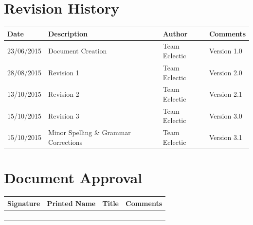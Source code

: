\documentclass[11pt]{article}
\begin{document}


\setcounter{tocdepth}{3}
\setcounter{secnumdepth}{5}
\tableofcontents

\newpage
\section{Revision History}
\begin{table}[h]
\begin{tabular}{llll}
\textbf{Date}          & \textbf{Description}  & \textbf{Author}       & \textbf{Comments}   \\ \hline
\multicolumn{1}{|R{2cm}|}{23/06/2015} & \multicolumn{1}{L{4.5cm}|}{Document Creation} & \multicolumn{1}{l|}{Team Eclectic} & \multicolumn{1}{L{4cm}|}{Version 1.0} \\ \hline
\multicolumn{1}{|R{2cm}|}{28/08/2015} & \multicolumn{1}{L{4.5cm}|}{Revision 1} & \multicolumn{1}{l|}{Team Eclectic} & \multicolumn{1}{L{4cm}|}{Version 2.0} \\ \hline
\multicolumn{1}{|R{2cm}|}{13/10/2015} & \multicolumn{1}{L{4.5cm}|}{Revision 2} & \multicolumn{1}{l|}{Team Eclectic} & \multicolumn{1}{L{4cm}|}{Version 2.1} \\ \hline
\multicolumn{1}{|R{2cm}|}{15/10/2015} & \multicolumn{1}{L{4.5cm}|}{Revision 3} & \multicolumn{1}{l|}{Team Eclectic} & \multicolumn{1}{L{4cm}|}{Version 3.0} \\ \hline
\multicolumn{1}{|R{2cm}|}{15/10/2015} & \multicolumn{1}{L{4.5cm}|}{Minor Spelling \& Grammar Corrections} & \multicolumn{1}{l|}{Team Eclectic} & \multicolumn{1}{L{4cm}|}{Version 3.1} \\ \hline
\end{tabular}
\end{table}

\section{Document Approval}
\begin{table}[h]
\begin{tabular}{llll}
\textbf{Signature}     & \textbf{Printed Name} & \textbf{Title}        & \textbf{Comments}     \\ \hline
\multicolumn{1}{|l|}{} & \multicolumn{1}{L{3.5cm}|}{} & \multicolumn{1}{L{3.5cm}|}{} & \multicolumn{1}{L{4cm}|}{} \\ \hline
\multicolumn{1}{|l|}{} & \multicolumn{1}{l|}{} & \multicolumn{1}{l|}{} & \multicolumn{1}{l|}{} \\ \hline
\multicolumn{1}{|l|}{} & \multicolumn{1}{l|}{} & \multicolumn{1}{l|}{} & \multicolumn{1}{l|}{} \\ \hline
\multicolumn{1}{|l|}{} & \multicolumn{1}{l|}{} & \multicolumn{1}{l|}{} & \multicolumn{1}{l|}{} \\ \hline
\end{tabular}
\end{table}
\end{document}
